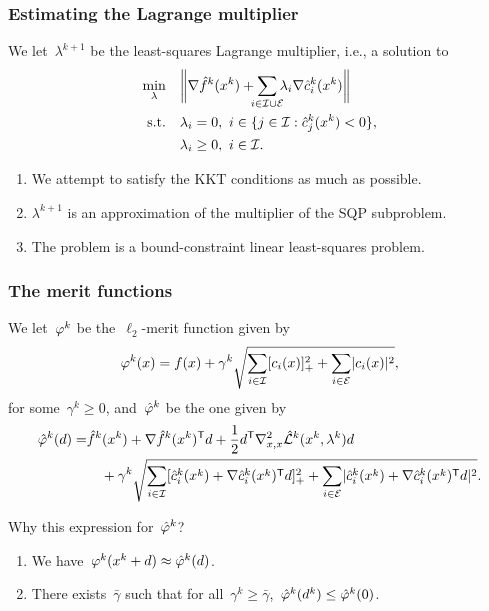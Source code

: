 \documentclass{polyu-presentation}  %
\newcommand{\con}[1]{c_{#1}}
\newcommand{\conm}[2][]{\hat{c}_{#2}\ifthenelse{\equal{#1}{}}{}{^{#1}}}
\newcommand{\ieq}{\mathcal{E}}
\newcommand{\iub}{\mathcal{I}}
\newcommand{\lagm}[1][]{\hat{\mathcal{L}}\ifthenelse{\equal{#1}{}}{}{^{#1}}}
\newcommand{\merit}[1][]{\varphi\ifthenelse{\equal{#1}{}}{}{^{#1}}}
\newcommand{\meritm}[1][]{\hat{\varphi}\ifthenelse{\equal{#1}{}}{}{^{#1}}}
\newcommand{\obj}{f}
\newcommand{\objm}[1][]{\hat{f}\ifthenelse{\equal{#1}{}}{}{^{#1}}}
\begin{document}
\begin{frame}
    \frametitle{Estimating the Lagrange multiplier}

	We let~$\lambda^{k + 1}$ be the \alert{least-squares Lagrange multiplier}, i.e., a solution to
    \begin{align*}
        \min_{\lambda}  & \quad \norm[\bigg]{\nabla \objm[k](x^k) + \sum_{\mathclap{i \in \iub \cup \ieq}} \lambda_i \nabla \conm[k]{i}(x^k)}\\
        \text{s.t.}     & \quad \lambda_i = 0, ~ i \in \set{j \in \iub : \conm[k]{j}(x^k) < 0},\\
                        & \quad \lambda_i \ge 0, ~ i \in \iub.
    \end{align*}

    \pause
    \begin{block}{}
        \begin{enumerate}[<+->]
            \item We attempt to satisfy the \alert{KKT conditions} as much as possible.
            \item $\lambda^{k + 1}$ is an approximation of the \alert{multiplier of the SQP subproblem}.
            \item The problem is a bound-constraint \alert{linear least-squares} problem.
        \end{enumerate}
    \end{block}
\end{frame}

\begin{frame}
    \frametitle{The merit functions}

	We let~$\merit[k]$ be the~\alert{$\ell_2$-merit function} given by
    \begin{equation*}
        \merit[k](x) = \obj(x) + \gamma^k \sqrt{\sum_{i \in \iub} \posp{\con{i}(x)}^2 + \sum_{i \in \ieq} \abs{\con{i}(x)}^2},
    \end{equation*}
    for some~$\gamma^k \ge 0$, and~$\meritm[k]$ be the one given by
    \begin{align*}
        \meritm[k](d) = & \objm[k](x^k) + \nabla \objm[k](x^k)^{\T} d + \frac{1}{2} d^{\T} \nabla_{x, x}^2 \lagm[k](x^k, \lambda^k) d\\
                        & \quad + \gamma^k \sqrt{\sum_{i \in \iub} \posp{\conm[k]{i}(x^k) + \nabla \conm[k]{i}(x^k)^{\T} d}^2 + \sum_{i \in \ieq} \abs{\conm[k]{i}(x^k) + \nabla \conm[k]{i}(x^k)^{\T} d}^2}.
    \end{align*}

    \begin{block}{Why this expression for~$\meritm[k]$?}
        \begin{enumerate}[<+(1)->]
            \item We have~$\merit[k](x^k + d) \approx \meritm[k](d)$.
            \item There exists~$\bar{\gamma}$ such that for all~$\gamma^k \ge \bar{\gamma}$,~$\meritm[k](d^k) \le \meritm[k](0)$.
        \end{enumerate}
    \end{block}
\end{frame}
\end{document}
